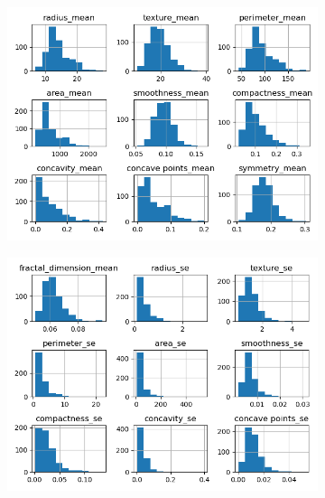 \begin{figure}[H]
     \centering
     \begin{subfigure}[b]{0.3\textwidth}
 \centering
\includegraphics[scale=0.3]{images/hist_cancer_t.png}
     \end{subfigure}
     \hfill
     \begin{subfigure}[b]{0.3\textwidth}
         \centering
 \centering
\includegraphics[scale=0.3]{images/hist_cancer_t_2.png}
     \end{subfigure}
     \hfill
     \begin{subfigure}[b]{0.3\textwidth}
 \centering

\end{subfigure}
\end{figure}
